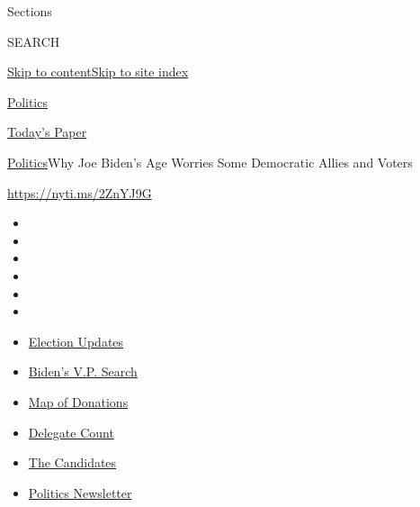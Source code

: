 Sections

SEARCH

\protect\hyperlink{site-content}{Skip to
content}\protect\hyperlink{site-index}{Skip to site index}

\href{https://www.nytimes.com/section/politics}{Politics}

\href{https://myaccount.nytimes.com/auth/login?response_type=cookie\&client_id=vi}{}

\href{https://www.nytimes.com/section/todayspaper}{Today's Paper}

\href{/section/politics}{Politics}\textbar{}Why Joe Biden's Age Worries
Some Democratic Allies and Voters

\url{https://nyti.ms/2ZnYJ9G}

\begin{itemize}
\item
\item
\item
\item
\item
\item
\end{itemize}

\begin{itemize}
\item
  \href{https://www.nytimes.com/2020/07/31/us/elections/biden-vs-trump.html?action=click\&pgtype=Article\&state=default\&region=TOP_BANNER\&context=storylines_menu}{Election
  Updates}
\item
  \href{https://www.nytimes.com/article/biden-vice-president-2020.html?action=click\&pgtype=Article\&state=default\&region=TOP_BANNER\&context=storylines_menu}{Biden's
  V.P. Search}
\item
  \href{https://www.nytimes.com/interactive/2020/07/24/us/politics/trump-biden-campaign-donors.html?action=click\&pgtype=Article\&state=default\&region=TOP_BANNER\&context=storylines_menu}{Map
  of Donations}
\item
  \href{https://www.nytimes.com/interactive/2020/us/elections/delegate-count-primary-results.html?action=click\&pgtype=Article\&state=default\&region=TOP_BANNER\&context=storylines_menu}{Delegate
  Count}
\item
  \href{https://www.nytimes.com/interactive/2019/us/politics/2020-presidential-candidates.html?action=click\&pgtype=Article\&state=default\&region=TOP_BANNER\&context=storylines_menu}{The
  Candidates}
\item
  \href{https://www.nytimes.com/newsletters/politics?action=click\&pgtype=Article\&state=default\&region=TOP_BANNER\&context=storylines_menu}{Politics
  Newsletter}
\end{itemize}

